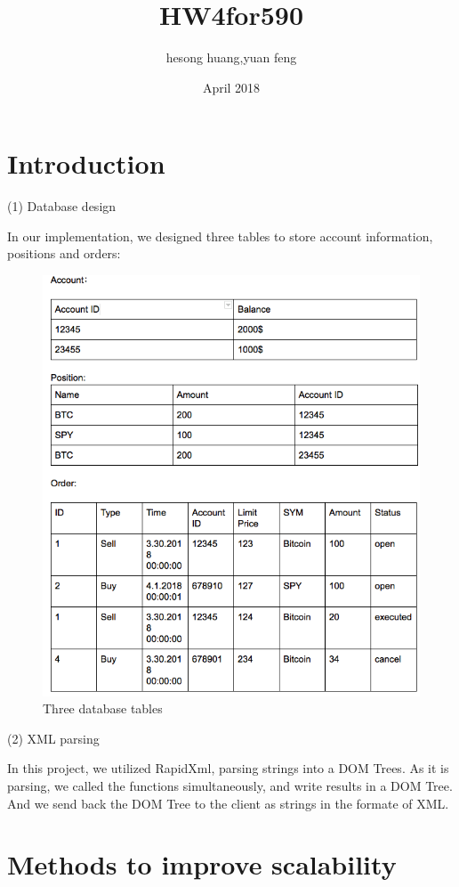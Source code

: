 \documentclass{article}
\title{HW4for590}
\author{hesong huang,yuan feng  }
\date{April 2018}
\begin{document}
\maketitle

\section{Introduction}
(1) Database design

In our implementation, we designed three tables to store account information, positions and orders:
\begin{figure}[h!]
\centering
\includegraphics[scale=0.45]{Snip3}
\caption{Three database tables}
\label{fig:Snip3}
\end{figure}

(2) XML parsing

In this project, we utilized RapidXml, parsing strings into a DOM Trees. As it is parsing, we called the functions simultaneously, and write results in a DOM Tree. And we send back the DOM Tree to the client as strings in the formate of XML.


\section{Methods to improve scalability}
\end{document}
